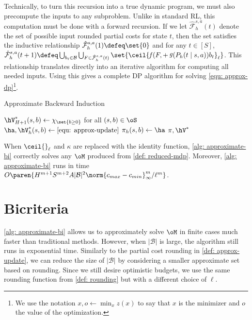 \documentclass[pdftex, a4paper, 12pt]{article}
\newcommand{\round}[2]{\ceil{#2}_{#1}}
\newcommand{\mB}{\mathcal{B}}
\newcommand{\cmin}{c_{min}}
\newcommand{\cmax}{c_{max}}
\newcommand{\hmF}{\hat{\mathcal{F}}}
\DeclareMathOperator*{\f}{\mathit{f}}
\DeclareMathOperator*{\g}{\mathit{g}}
\begin{document}
\begin{remark}[DP details]
    Technically, to turn this recursion into a true dynamic program, we must also precompute the inputs to any subproblem. Unlike in standard RL, this computation must be done with a forward recursion. If we let $\hmF_h^{s,a}(t)$ denote the set of possible input rounded partial costs for state $t$, then the set satisfies the inductive relationship $\hmF_h^{s,a}(1) \defeq \set{0}$ and for any $t \in [S]$, $\hmF_h^{s,a}(t+1) \defeq \bigcup_{b_t \in \mB} \bigcup_{F \in \hmF_{h}^{s,a}(t)} \set{\round{\ell}{\f(F, + \g(P_h(t \mid s,a))b_t}}$. This relationship translates directly into an iterative algorithm for computing all needed inputs. Using this gives a complete DP algorithm for solving \eqref{equ: approx-dp}\footnote{We use the notation $x, o \gets \min_x z(x)$ to say that $x$ is the minimizer and $o$ the value of the optimization.}.
\end{remark}



\begin{algorithm}[t]
    \caption{Approximate Backward Induction}\label{alg: approximate-bi}
    \begin{algorithmic}[1]
        \Require{$\oM$}
        \State $\hV^*_{H+1}(s,b) \gets \chi_{\set{b \geq 0}}$ for all $(s,b) \in \oS$
                \State $\ha, \hV^*_{h}(s,b) \gets \eqref{equ: approx-update}$
                \State $\pi_h(s,b) \gets \ha$
            \EndFor
        \EndFor
        \State \Return $\pi, \hV^*$
    \end{algorithmic}
\end{algorithm}

\begin{theorem}\label{thm: approximate-bi}
    When $\round{\ell}{}$ and $\kappa$ are replaced with the identity function, \cref{alg: approximate-bi} correctly solves any $\oM$ produced from \cref{def: reduced-mdp}. Moreover, \cref{alg: approximate-bi} runs in time $O\paren{H^{m+1}S^{m+2}A|\mB|^2\norm{\cmax - \cmin}_{\infty}^m/\ell^m}$.
\end{theorem}

\section{Bicriteria}\label{sec: bicriteria}

\cref{alg: approximate-bi} allows us to approximately solve $\oM$ in finite cases much faster than traditional methods. However, when $|\mB|$ is large, the algorithm still runs in exponential time. Similarly to the partial cost rounding in \cref{def: approx-update}, we can reduce the size of $|\mB|$ by considering a smaller approximate set based on rounding. Since we still desire optimistic budgets, we use the same rounding function from \cref{def: rounding} but with a different choice of $\ell$.
\end{document}
